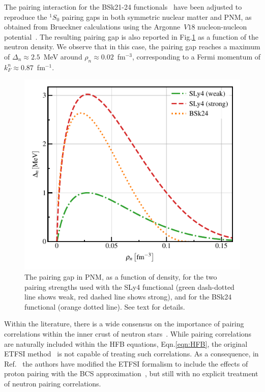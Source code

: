 \documentclass[
    amsmath,amssymb,
    aps,
    prc,
    floatfix,
]{revtex4-2}
\begin{document}
The pairing interaction for the BSk21-24 functionals~\cite{chamelEffectiveContactPairing2010} have been adjusted to reproduce the $^1S_0$ pairing gaps in both symmetric nuclear matter and PNM, as obtained from Brueckner calculations using the Argonne~$V18$ nucleon-nucleon potential~\cite{cao2006screening}.  
The resulting pairing gap is also reported in Fig.\ref{fig:PNM_gaps} as a function of the neutron density. We observe that in this case, the pairing gap reaches a maximum of $\Delta_n\approx2.5$~MeV around $\rho_n\approx0.02$~fm$^{-3}$, corresponding to a Fermi momentum of $k_F^n\approx0.87$~fm$^{-1}$.

    \begin{figure}
        \centering
        \includegraphics{figs/PNM_gaps.pdf}
        \caption{The pairing gap in PNM, as a function of density, for the two pairing strengths used with the SLy4 functional (green dash-dotted line shows weak, red dashed line shows strong), and for the BSk24 functional (orange dotted line). See text for details.}
        \label{fig:PNM_gaps}
    \end{figure}  
    
Within the literature, there is a wide consensus on the importance of pairing correlations within the inner crust of neutron stars~\cite{barranco1997role,dean2003pairing,baldo2006role,grill2011cluster,pastore2011superfluid,sandulescu2004superfluid,chamel2012neutron,maurizio2014nuclear,watanabe2017superfluid,bennemann2008superconductivity}.
While pairing correlations are naturally included within the HFB equations, Eqn.\ref{eqn:HFB}, the original ETFSI method~\cite{onsi2008semi} is not capable of treating such correlations. As a consequence, in Ref.~\cite{pearson2015role} the authors have modified the ETFSI formalism to include the effects of proton pairing with the BCS approximation~\cite{ring2004nuclear}, but still with no explicit treatment of neutron pairing correlations.
\end{document}
